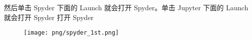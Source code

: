 \documentclass[main.tex]{subfiles}
\begin{document}
	然后单击 Spyder 下面的 Launch 就会打开 Spyder。单击 Jupyter 下面的 Launch 就会打开 Spyder
打开 Spyder
\begin{figure}[t]
	\texttt{[image: png/spyder\_1st.png]}
\end{figure}
\end{document}
